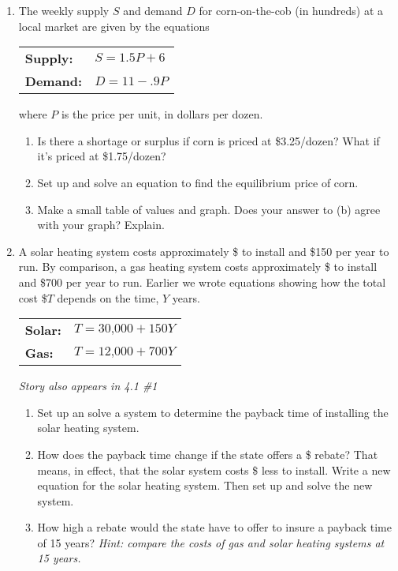 \begin{enumerate}
\item The weekly supply $S$ and demand $D$ for corn-on-the-cob (in hundreds) at a local market are given by the equations 
\begin{center}
\begin{tabular} {ll}
\textbf{Supply:} & $S = 1.5P+6$ \\
\textbf{Demand:} & $D= 11 - .9P$ \\ 
\end{tabular}
\end{center} 
where $P$ is the price per unit, in dollars per dozen.
\begin{enumerate}
\item Is there a shortage or surplus if corn is priced at \$3.25/dozen?  What if it's priced at \$1.75/dozen?
\item Set up and solve an equation to find the equilibrium price of corn.
\item Make a small table of values and graph.  Does your answer to (b) agree with your graph?  Explain.
\end{enumerate}

\item A solar heating system costs approximately \$ to install and \$150 per year to run.  By comparison, a gas heating system costs approximately \$ to install and \$700 per year to run.   Earlier we wrote equations showing how the total cost \$$T$ depends on the time, $Y$ years.
\begin{center}
\begin{tabular} {ll}
\textbf{Solar:} & $T  =\text{30,000} + 150Y$\\
\textbf{Gas:} & $T  = \text{12,000} + 700Y$ \\ 
\end{tabular}
\end{center}

\hfill \emph{Story also appears in 4.1 \#1}
\begin{enumerate}
\item Set up an solve a system to determine the payback time of installing the solar heating system.
\item How does the payback time change if the state offers a \$ rebate?  That means, in effect, that the solar system costs \$ less to install. Write a new equation for the solar heating system.  Then set up and solve the new system.
\item How high a rebate would the state have to offer to insure a payback time of 15 years?  \emph{Hint:  compare the costs of gas and solar heating systems at 15 years.}
\end{enumerate}

\end{enumerate}

